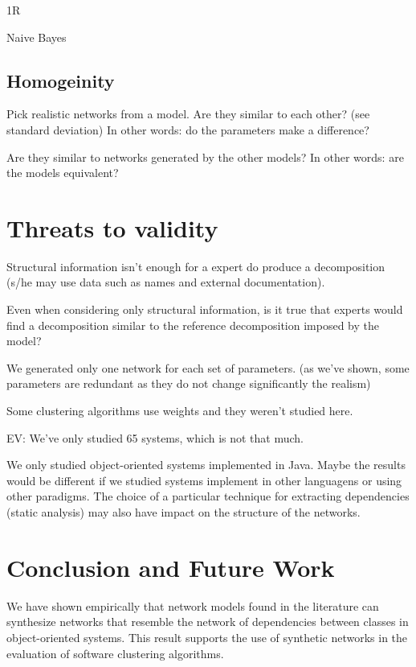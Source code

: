 1R

Naive Bayes

\subsection{Homogeinity}

Pick realistic networks from a model. Are they similar to each other? (see
standard deviation) In other words: do the parameters make a difference?

Are they similar to networks generated by the other models? In other words: are
the models equivalent?

\section{Threats to validity}

Structural information isn't enough for a expert do produce a
decomposition (s/he may use data such as names and external documentation). 

Even when considering only structural information, is it true
that experts would find a decomposition similar to the reference decomposition
imposed by the model?

We generated only one network for each set of parameters. (as we've shown, some
parameters are redundant as they do not change significantly the realism)

Some clustering algorithms use weights and they weren't studied here.

EV: We've only studied 65 systems, which is not that much.

We only studied object-oriented systems implemented in Java. Maybe the results
would be different if we studied systems implement in other languagens or using
other paradigms. The choice of a particular technique for extracting
dependencies (static analysis) may also have impact on the structure of the
networks.


\section{Conclusion and Future Work}

We have shown empirically that network models found in the literature can
synthesize networks that resemble the network of dependencies between classes in
object-oriented systems. This result supports the use of synthetic networks in
the evaluation of software clustering algorithms.

